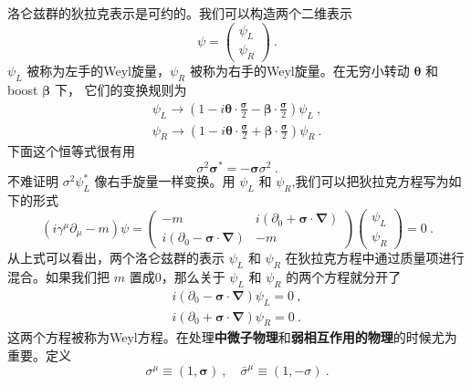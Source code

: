 
洛仑兹群的狄拉克表示是可约的。我们可以构造两个二维表示
\begin{equation}
\psi = \begin{pmatrix}
\psi_L \\
\psi_R
\end{pmatrix}~.
\end{equation}
$\psi_L$ 被称为左手的Weyl旋量，$\psi_R$ 被称为右手的Weyl旋量。在无穷小转动 $\mathbf \theta$ 和boost $\mathbf \beta$ 下， 它们的变换规则为
\begin{align}
\psi_L \rightarrow (1-i \boldsymbol \theta \cdot \frac{\boldsymbol \sigma}{2} - \boldsymbol \beta \cdot \frac{\boldsymbol \sigma}{2})\psi_L ~, \\
\psi_R \rightarrow (1-i\boldsymbol \theta \cdot \frac{\boldsymbol \sigma}{2}+ \boldsymbol \beta \cdot \frac{\boldsymbol \sigma}{2})\psi_R ~.
\end{align}
下面这个恒等式很有用
\begin{equation}
\sigma^2\boldsymbol \sigma^* = - \boldsymbol \sigma \sigma^2~.
\end{equation}
不难证明 $\sigma^2\psi^*_L$ 像右手旋量一样变换。用 $\psi_L$ 和 $\psi_R$,我们可以把狄拉克方程写为如下的形式
\begin{equation}
(i\gamma^\mu\partial_\mu - m)\psi = \begin{pmatrix}
- m & i (\partial_0+\boldsymbol \sigma \cdot \boldsymbol \nabla) \\
i(\partial_0-\boldsymbol\sigma\cdot \boldsymbol\nabla) & -m 
\end{pmatrix} \begin{pmatrix}
\psi_L \\ \psi_R 
\end{pmatrix}=0~.
\end{equation}
从上式可以看出，两个洛仑兹群的表示 $\psi_L$ 和 $\psi_R$ 在狄拉克方程中通过质量项进行混合。如果我们把 $m$ 置成0，那么关于 $\psi_L$ 和 $\psi_R$ 的两个方程就分开了
\begin{align}
i(\partial_0 - \boldsymbol \sigma \cdot \boldsymbol \nabla) \psi_L = 0~, \\
i(\partial_0 + \boldsymbol \sigma \cdot \boldsymbol \nabla) \psi_R = 0~. 
\end{align}
这两个方程被称为Weyl方程。在处理\textbf{中微子物理}和\textbf{弱相互作用的物理}的时候尤为重要。定义
\begin{equation}
\sigma^\mu \equiv (1,\boldsymbol \sigma)~, \quad \bar \sigma^\mu \equiv (1,-\sigma)~.
\end{equation}
